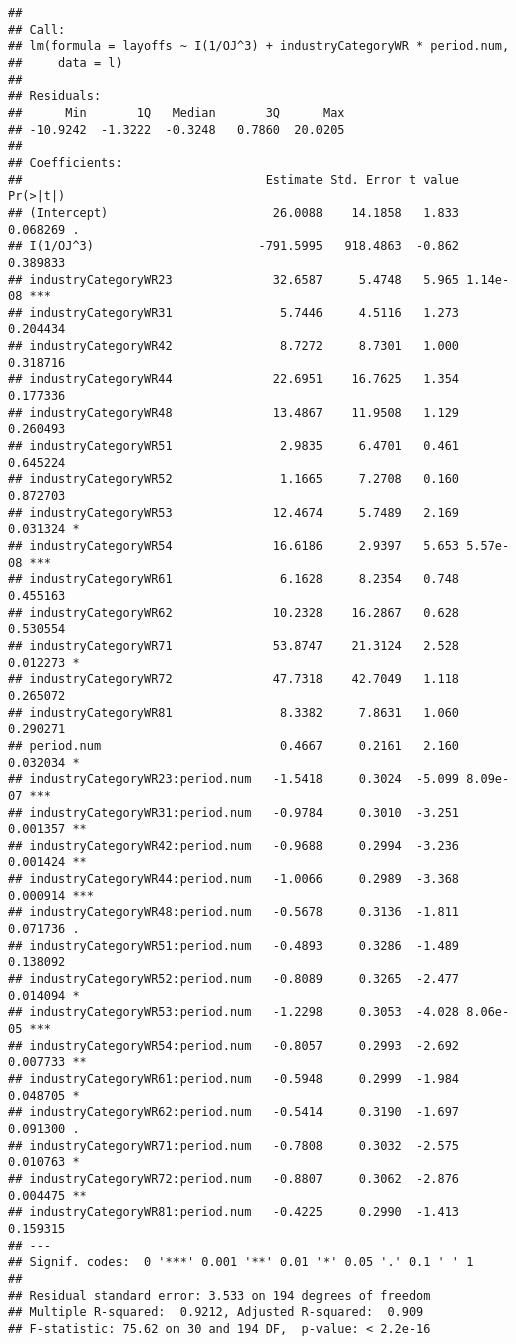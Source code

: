 \documentclass[
]{article}
\begin{document}
\begin{verbatim}
## 
## Call:
## lm(formula = layoffs ~ I(1/OJ^3) + industryCategoryWR * period.num, 
##     data = l)
## 
## Residuals:
##      Min       1Q   Median       3Q      Max 
## -10.9242  -1.3222  -0.3248   0.7860  20.0205 
## 
## Coefficients:
##                                  Estimate Std. Error t value Pr(>|t|)    
## (Intercept)                       26.0088    14.1858   1.833 0.068269 .  
## I(1/OJ^3)                       -791.5995   918.4863  -0.862 0.389833    
## industryCategoryWR23              32.6587     5.4748   5.965 1.14e-08 ***
## industryCategoryWR31               5.7446     4.5116   1.273 0.204434    
## industryCategoryWR42               8.7272     8.7301   1.000 0.318716    
## industryCategoryWR44              22.6951    16.7625   1.354 0.177336    
## industryCategoryWR48              13.4867    11.9508   1.129 0.260493    
## industryCategoryWR51               2.9835     6.4701   0.461 0.645224    
## industryCategoryWR52               1.1665     7.2708   0.160 0.872703    
## industryCategoryWR53              12.4674     5.7489   2.169 0.031324 *  
## industryCategoryWR54              16.6186     2.9397   5.653 5.57e-08 ***
## industryCategoryWR61               6.1628     8.2354   0.748 0.455163    
## industryCategoryWR62              10.2328    16.2867   0.628 0.530554    
## industryCategoryWR71              53.8747    21.3124   2.528 0.012273 *  
## industryCategoryWR72              47.7318    42.7049   1.118 0.265072    
## industryCategoryWR81               8.3382     7.8631   1.060 0.290271    
## period.num                         0.4667     0.2161   2.160 0.032034 *  
## industryCategoryWR23:period.num   -1.5418     0.3024  -5.099 8.09e-07 ***
## industryCategoryWR31:period.num   -0.9784     0.3010  -3.251 0.001357 ** 
## industryCategoryWR42:period.num   -0.9688     0.2994  -3.236 0.001424 ** 
## industryCategoryWR44:period.num   -1.0066     0.2989  -3.368 0.000914 ***
## industryCategoryWR48:period.num   -0.5678     0.3136  -1.811 0.071736 .  
## industryCategoryWR51:period.num   -0.4893     0.3286  -1.489 0.138092    
## industryCategoryWR52:period.num   -0.8089     0.3265  -2.477 0.014094 *  
## industryCategoryWR53:period.num   -1.2298     0.3053  -4.028 8.06e-05 ***
## industryCategoryWR54:period.num   -0.8057     0.2993  -2.692 0.007733 ** 
## industryCategoryWR61:period.num   -0.5948     0.2999  -1.984 0.048705 *  
## industryCategoryWR62:period.num   -0.5414     0.3190  -1.697 0.091300 .  
## industryCategoryWR71:period.num   -0.7808     0.3032  -2.575 0.010763 *  
## industryCategoryWR72:period.num   -0.8807     0.3062  -2.876 0.004475 ** 
## industryCategoryWR81:period.num   -0.4225     0.2990  -1.413 0.159315    
## ---
## Signif. codes:  0 '***' 0.001 '**' 0.01 '*' 0.05 '.' 0.1 ' ' 1
## 
## Residual standard error: 3.533 on 194 degrees of freedom
## Multiple R-squared:  0.9212, Adjusted R-squared:  0.909 
## F-statistic: 75.62 on 30 and 194 DF,  p-value: < 2.2e-16
\end{verbatim}
\end{document}
